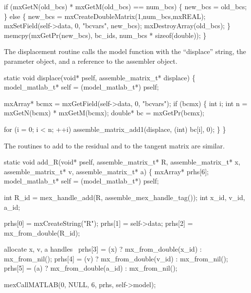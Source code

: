     if (mxGetN(old_bcs) * mxGetM(old_bcs) == num_bcs) \{
        new_bcs = old_bcs;
    \} else \{
        new_bcs = mxCreateDoubleMatrix(1,num_bcs,mxREAL);
        mxSetField(self->data, 0, "bcvars", new_bcs);
        mxDestroyArray(old_bcs);
    \}
    memcpy(mxGetPr(new_bcs), bc_ids, num_bcs * sizeof(double));
\}

\nwendcode{}\nwdocspar

The displacement routine calls the model function with
the ``displace'' string, the parameter object, and a reference
to the assembler object.  

\nwenddocs{}\plusendmoddef
static void displace(void* pself, assemble_matrix_t* displace)
\{
    model_matlab_t* self = (model_matlab_t*) pself;

    mxArray* bcmx = mxGetField(self->data, 0, "bcvars");
    if (bcmx) \{
        int i;
        int n = mxGetN(bcmx) * mxGetM(bcmx);
        double* bc = mxGetPr(bcmx);

        for (i = 0; i < n; ++i)
            assemble_matrix_add1(displace, (int) bc[i], 0);
    \}
\}

\nwendcode{}\nwdocspar

The routines to add to the residual and to the tangent matrix are similar.

\nwenddocs{}\plusendmoddef
static void add_R(void* pself, assemble_matrix_t* R, 
                  assemble_matrix_t* x,
                  assemble_matrix_t* v,
                  assemble_matrix_t* a)
\{
    mxArray* prhs[6];
    model_matlab_t* self = (model_matlab_t*) pself;

    int R_id = mex_handle_add(R, assemble_mex_handle_tag());
    int x_id, v_id, a_id;

    prhs[0] = mxCreateString("R");
    prhs[1] = self->data;
    prhs[2] = mx_from_double(R_id);

    \LA{}allocate x, v, a handles~{\nwtagstyle{}}\RA{}
    prhs[3] = (x) ? mx_from_double(x_id) : mx_from_nil();
    prhs[4] = (v) ? mx_from_double(v_id) : mx_from_nil();
    prhs[5] = (a) ? mx_from_double(a_id) : mx_from_nil();

    mexCallMATLAB(0, NULL, 6, prhs, self->model); 

